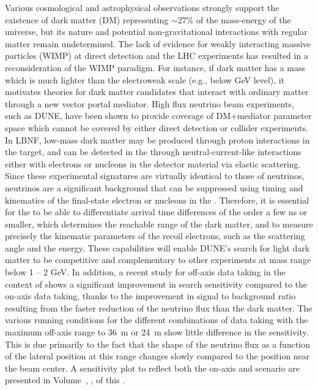 Various cosmological and astrophysical observations strongly support the existence of dark matter (DM) representing $\sim$27\% of the mass-energy of the universe, but its nature and potential non-gravitational interactions with regular matter remain undetermined. The lack of evidence for weakly interacting massive particles (WIMP) at direct detection and the LHC experiments has resulted in a reconsideration of the WIMP paradigm. For instance, if dark matter has a mass which is much lighter than the electroweak scale (e.g., below GeV level), it motivates theories for dark matter candidates that interact with ordinary matter through a new vector portal mediator. High flux neutrino beam experiments, such as DUNE, have been shown to provide coverage of DM+mediator parameter space which cannot be covered by either direct detection or collider experiments. 
In LBNF, low-mass dark matter may be produced through proton interactions in the target, and can be detected in the  through neutral-current-like interactions either with electrons or nucleons in the detector material via elastic scattering.  Since these experimental signatures are virtually identical to those of neutrinos, neutrinos are a significant background that can be suppressed using timing and kinematics of the final-state electron or nucleons in the . Therefore, it is essential for the  to be able to differentiate arrival time differences of the order a few ns or smaller, which determines the reachable range of the dark matter, and to measure precisely the kinematic parameters of the recoil electrons, such as the scattering angle and the energy.  These capabilities will enable DUNE's search for light dark matter to be competitive and complementary to other experiments at mass range below 1 – 2 GeV.
In addition, a recent study for off-axis data taking in the context of  \cite{DeRomeri:2019kic} shows a significant improvement in search sensitivity compared to the on-axis data taking, thanks to the improvement in signal to background ratio resulting from the faster reduction of the neutrino flux than the dark matter. The various running conditions for the different combinations of data taking with the maximum off-axis range to 36~m or 24~m show little difference in the sensitivity. This is due primarily to the fact that the shape of the neutrino flux as a function of the lateral position at this range changes slowly compared to the position near the beam center. A sensitivity plot to reflect both the on-axis and  scenario are presented in Volume~\volnumberphysics, \voltitlephysics{}, of this .

